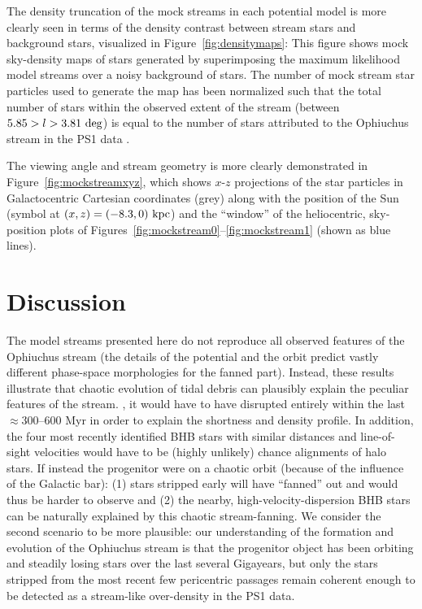 \documentclass[letterpaper,12pt,preprint]{aastex}
\begin{document}
The density truncation of the mock streams in each potential model is more clearly seen in terms of the density contrast between stream stars and background stars, visualized in Figure~\ref{fig:densitymaps}: This figure shows mock sky-density maps of stars generated by superimposing the maximum likelihood model streams over a noisy background of stars. The number of mock stream star particles used to generate the map has been normalized such that the total number of stars within the observed extent of the stream (between $5.85 > l > 3.81~{\rm deg}$) is equal to the number of stars attributed to the Ophiuchus stream in the PS1 data \citep[$N \approx 500$][]{bernard14}.

The viewing angle and stream geometry is more clearly demonstrated in Figure~\ref{fig:mockstreamxyz}, which shows $x$-$z$ projections of the star particles in Galactocentric Cartesian coordinates (grey) along with the position of the Sun (symbol at $(x,z)=(-8.3,0)~{\rm kpc}$) and the ``window'' of the heliocentric, sky-position plots of Figures~\ref{fig:mockstream0}--\ref{fig:mockstream1} (shown as blue lines).

\section{Discussion}\label{sec:discussion}

The model streams presented here do not reproduce all observed features of the Ophiuchus stream (the details of the potential and the orbit predict vastly different phase-space morphologies for the fanned part). Instead, these results illustrate that chaotic evolution of tidal debris can plausibly explain the peculiar features of the stream. , it would have to have disrupted entirely within the last $\approx$300--600 Myr in order to explain the shortness and density profile. In addition, the four most recently identified BHB stars with similar distances and line-of-sight velocities would have to be (highly unlikely) chance alignments of halo stars. If instead the progenitor were on a chaotic orbit (because of the influence of the Galactic bar): (1) stars stripped early will have ``fanned'' out and would thus be harder to observe and (2) the nearby, high-velocity-dispersion BHB stars can be naturally explained by this chaotic stream-fanning. We consider the second scenario to be more plausible: our understanding of the formation and evolution of the Ophiuchus stream is that the progenitor object has been orbiting and steadily losing stars over the last several Gigayears, but only the stars stripped from the most recent few pericentric passages remain coherent enough to be detected as a stream-like over-density in the PS1 data.
\end{document}
